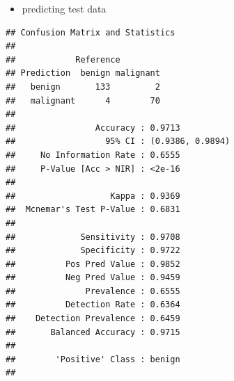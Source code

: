 \documentclass[]{article}
\newenvironment{Shaded}{\begin{snugshade}}{\end{snugshade}}
\newcommand{\KeywordTok}[1]{\textcolor[rgb]{0.13,0.29,0.53}{\textbf{{#1}}}}
\newcommand{\DataTypeTok}[1]{\textcolor[rgb]{0.13,0.29,0.53}{{#1}}}
\newcommand{\FloatTok}[1]{\textcolor[rgb]{0.00,0.00,0.81}{{#1}}}
\newcommand{\StringTok}[1]{\textcolor[rgb]{0.31,0.60,0.02}{{#1}}}
\newcommand{\OtherTok}[1]{\textcolor[rgb]{0.56,0.35,0.01}{{#1}}}
\newcommand{\NormalTok}[1]{{#1}}
\providecommand{\tightlist}{%
  \setlength{\itemsep}{0pt}\setlength{\parskip}{0pt}}
\begin{document}
\begin{itemize}
\tightlist
\item
  predicting test data
\end{itemize}

\begin{Shaded}
\end{Shaded}

\begin{verbatim}
## Confusion Matrix and Statistics
## 
##            Reference
## Prediction  benign malignant
##   benign       133         2
##   malignant      4        70
##                                           
##                Accuracy : 0.9713          
##                  95% CI : (0.9386, 0.9894)
##     No Information Rate : 0.6555          
##     P-Value [Acc > NIR] : <2e-16          
##                                           
##                   Kappa : 0.9369          
##  Mcnemar's Test P-Value : 0.6831          
##                                           
##             Sensitivity : 0.9708          
##             Specificity : 0.9722          
##          Pos Pred Value : 0.9852          
##          Neg Pred Value : 0.9459          
##              Prevalence : 0.6555          
##          Detection Rate : 0.6364          
##    Detection Prevalence : 0.6459          
##       Balanced Accuracy : 0.9715          
##                                           
##        'Positive' Class : benign          
## 
\end{verbatim}

\begin{Shaded}
\end{Shaded}
\end{document}

